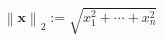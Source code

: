 \begin{equation}[H]
    \left\|{\mathbf {x}}\right\|_{2}:={\sqrt {x_{1}^{2}+\cdots +x_{n}^{2}}}
    \label{equations:euclidean_norm}
\end{equation}